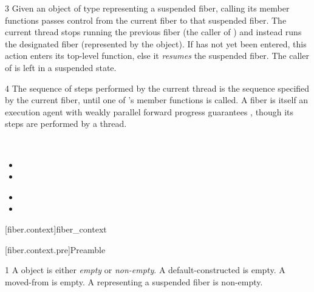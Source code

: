3 Given an object of type \fiber representing a suspended fiber, calling
its \anyresume member functions passes control from the current fiber to that
suspended fiber. The current thread stops running the previous fiber (the
caller of \anyresume) and instead runs the designated fiber (represented by
the \fiber object). If  has not yet been entered,
this action enters its top-level function, else it \emph{resumes} the suspended
fiber. The caller of \anyresume is left in a suspended state.

4 The sequence of steps performed by the current thread is the sequence
specified by the current fiber, until one of \fiber's \anyresume member
functions is called. A fiber is itself an execution agent with weakly parallel
forward progress guarantees , though its steps are
performed by a thread.


\\
\begin{itemize}
    \item {}
    \item {}
\end{itemize}


\begin{itemize}
    \item {}
    \item {}
\end{itemize}


\setcounter{section}{33}
\setcounter{subsection}{11}
\setcounter{secnumdepth}{4}

[fiber.context]{fiber\_context}

[fiber.context.pre]{Preamble}

1 A \fiber object is either \emph{empty} or \emph{non-empty}. A
default-constructed \fiber is empty. A moved-from \fiber is empty. A \fiber
representing a suspended fiber is non-empty.

